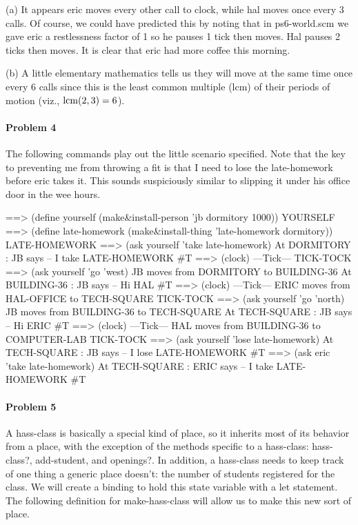 (a)  It appears {\cf eric} moves every other call to {\cf clock},
while {\cf hal} moves once every 3 calls. Of course, we could have predicted
this by noting that in {\cf ps6-world.scm} we gave {\cf eric} a {\cf
restlessness} factor of 1 so he pauses 1 tick then moves. {\cf Hal} pauses 2
ticks then moves. It is clear that {\cf eric} had more coffee this morning.

(b)  A little elementary mathematics tells us they will move at the
same time once every 6 calls since this is the least common multiple (lcm) of
their periods of motion (viz., ${\rm lcm}(2,3) = 6$).

\newpage

\paragraph{Problem 4}

The following commands play out the little scenario specified.  Note
that the key to preventing me from throwing a fit is that I need to
{\cf lose} the {\cf late-homework} before {\cf eric} {\cf take}s it.
This sounds suspiciously similar to slipping it under his office door in the
wee hours.

\beginlisp
==> (define yourself (make\&install-person 'jb dormitory 1000))
YOURSELF
\null
==> (define late-homework (make\&install-thing 'late-homework dormitory))
LATE-HOMEWORK
\null
==> (ask yourself 'take late-homework)
At DORMITORY : JB says -- I take LATE-HOMEWORK
\#T
\null
==> (clock)
---Tick---
TICK-TOCK
\null
==> (ask yourself 'go 'west)
JB moves from DORMITORY to BUILDING-36
At BUILDING-36 : JB says -- Hi HAL
\#T
\null
==> (clock)
---Tick---
ERIC moves from HAL-OFFICE to TECH-SQUARE
TICK-TOCK
\null
==> (ask yourself 'go 'north)
JB moves from BUILDING-36 to TECH-SQUARE
At TECH-SQUARE : JB says -- Hi ERIC
\#T
\null
==> (clock)
---Tick---
HAL moves from BUILDING-36 to COMPUTER-LAB
TICK-TOCK
\null
==> (ask yourself 'lose late-homework)
At TECH-SQUARE : JB says -- I lose LATE-HOMEWORK
\#T
\null
==> (ask eric 'take late-homework)
At TECH-SQUARE : ERIC says -- I take LATE-HOMEWORK
\#T
\endlisp

\newpage

\paragraph{Problem 5}

A {\cf hass-class} is basically a special kind of place, so it
inherits most of its behavior from a place, with the exception of
the methods specific to a {\cf hass-class}: {\cf hass-class?}, {\cf
add-student}, and {\cf openings?}.  In addition, a {\cf hass-class}
needs to keep track of one thing a generic place doesn't: the number
of students registered for the class.  We will create a binding to
hold this state variable with a {\cf let} statement.  The following
definition for {\cf make-hass-class} will allow us to make this new
sort of place.

